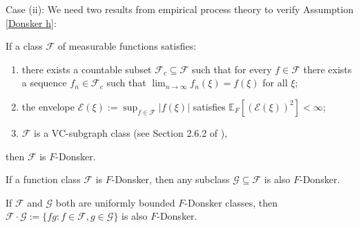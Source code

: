 \documentclass[mnsc,blindrev]{informs4} %
\begin{document}
Case (ii): We need two results from empirical process theory to verify Assumption \ref{Donsker h}:
\begin{theorem}\label{VC implies Donsker}
If a class $\mathcal F$ of measurable functions satisfies:
\begin{enumerate}
\item[i.]there exists a countable subset $\mathcal F_c\subseteq \mathcal F$ such that for every $f\in\mathcal F$ there exists a sequence $f_n\in \mathcal F_c$ such that $\lim_{n\to\infty}f_n(\xi)=f(\xi)$ for all $\xi$;
\item[ii.]the envelope $\mathcal E(\xi):=\sup_{f\in \mathcal F}\lvert f(\xi)\rvert$ satisfies $\mathbb E_F[(\mathcal E(\xi))^2]<\infty$;
\item[iii.]$\mathcal F$ is a VC-subgraph class (see Section 2.6.2 of \cite{van1996weak}),
\end{enumerate}
then $\mathcal F$ is $F$-Donsker.
\end{theorem}
\begin{theorem}\label{Donsker permanance:subclass}
If a function class $\mathcal F$ is $F$-Donsker, then any subclass $\mathcal G\subseteq \mathcal F$ is also $F$-Donsker.
\end{theorem}
\begin{theorem}\label{Donsker permanance:product}
If $\mathcal F$ and $\mathcal G$ both are uniformly bounded $F$-Donsker classes, then $\mathcal F\cdot \mathcal G:=\{fg:f\in\mathcal F,g\in\mathcal G\}$ is also $F$-Donsker.
\end{theorem}
\end{document}
